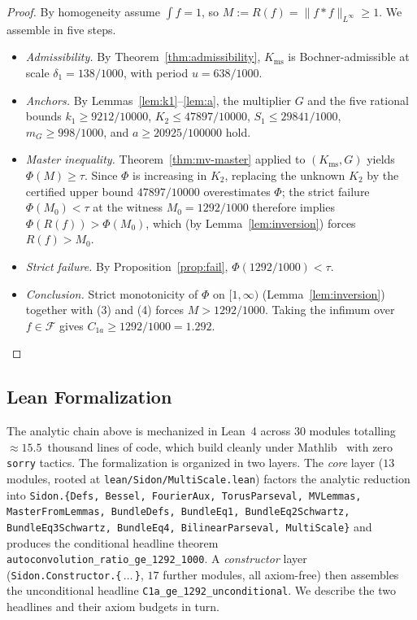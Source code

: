 \documentclass[11pt, letterpaper]{article}
\theoremstyle{paperplain}
\theoremstyle{paperdef}
\newcommand{\Linf}{L^\infty}
\newcommand{\Kms}{K_{\mathrm{ms}}}
\begin{document}
\begin{proof}
By homogeneity assume $\int f=1$, so $M:=R(f)=\|f*f\|_{\Linf}\ge 1$.
We assemble in five steps.
\begin{itemize}[leftmargin=2em]
\item[(1)] \emph{Admissibility.}  By Theorem~\ref{thm:admissibility},
$\Kms$ is Bochner-admissible at scale $\delta_1=138/1000$, with
period $u=638/1000$.
\item[(2)] \emph{Anchors.}  By Lemmas~\ref{lem:k1}--\ref{lem:a}, the
multiplier $G$ and the five rational bounds
$k_1\ge 9212/10000$, $K_2\le 47897/10000$, $S_1\le 29841/1000$,
$m_G\ge 998/1000$, and $a\ge 20925/100000$ hold.
\item[(3)] \emph{Master inequality.}  Theorem~\ref{thm:mv-master}
applied to $(\Kms,G)$ yields $\Phi(M)\ge \tau$.  Since $\Phi$ is
increasing in $K_2$, replacing the unknown $K_2$ by the certified
upper bound $47897/10000$ overestimates $\Phi$; the strict failure
$\Phi(M_0)<\tau$ at the witness $M_0=1292/1000$ therefore implies
$\Phi(R(f))>\Phi(M_0)$, which (by Lemma~\ref{lem:inversion}) forces
$R(f)>M_0$.
\item[(4)] \emph{Strict failure.}  By Proposition~\ref{prop:fail},
$\Phi(1292/1000)<\tau$.
\item[(5)] \emph{Conclusion.}  Strict monotonicity of $\Phi$ on
$[1,\infty)$ (Lemma~\ref{lem:inversion}) together with (3) and (4)
forces $M>1292/1000$.  Taking the infimum over $f\in\mathcal{F}$
gives $C_{1a}\ge 1292/1000=1.292$.\qedhere
\end{itemize}
\end{proof}

\subsection{Lean Formalization}\label{subsec:proof-lean}

The analytic chain above is mechanized in Lean~4 across $30$ modules
totalling $\approx 15.5$~thousand lines of code, which build cleanly
under Mathlib~\cite{Mathlib,Lean} with zero \texttt{sorry} tactics.
The formalization is organized in two layers.  The \emph{core} layer
($13$ modules, rooted at \texttt{lean/Sidon/MultiScale.lean}) factors
the analytic reduction into
\texttt{Sidon.\{Defs, Bessel, FourierAux, TorusParseval, MVLemmas,
MasterFromLemmas, BundleDefs, BundleEq1, BundleEq2Schwartz,
BundleEq3Schwartz, BundleEq4, BilinearParseval, MultiScale\}} and
produces the conditional headline theorem
\texttt{autoconvolution\_ratio\_ge\_1292\_1000}.  A \emph{constructor}
layer (\texttt{Sidon.Constructor.\{$\,\ldots\,$\}}, $17$ further
modules, all axiom-free) then assembles the unconditional headline
\texttt{C1a\_ge\_1292\_unconditional}.  We describe the two headlines
and their axiom budgets in turn.
\end{document}
